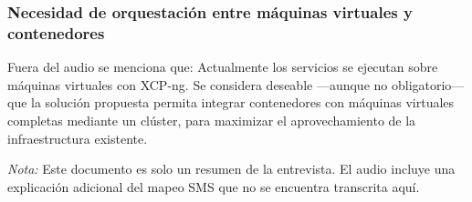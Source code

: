 \subsubsection{Necesidad de orquestación entre máquinas virtuales y contenedores}
Fuera del audio se menciona que: Actualmente los servicios se ejecutan sobre máquinas virtuales con XCP-ng. Se considera deseable —aunque no obligatorio— que la solución propuesta permita integrar contenedores con máquinas virtuales completas mediante un clúster, para maximizar el aprovechamiento de la infraestructura existente.

\bigskip\noindent \textit{Nota:} Este documento es solo un resumen de la entrevista. El audio incluye una explicación adicional del mapeo SMS que no se encuentra transcrita aquí.